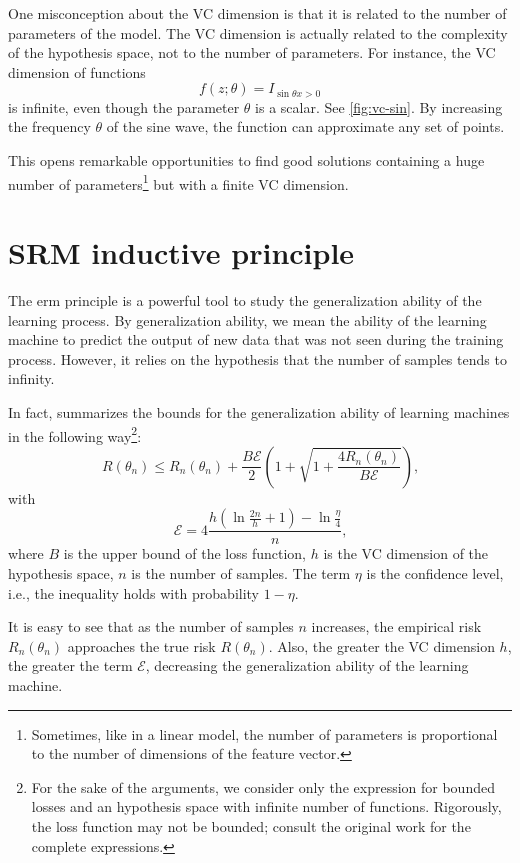 One misconception about the VC dimension is that it is related to the number of parameters
of the model.  The VC dimension is actually related to the complexity of the hypothesis space, not
to the number of parameters.  For instance, the VC dimension of functions
\[
  f(z; \theta) = I_{\sin \theta x > 0}
\]
is infinite, even though the parameter $\theta$ is a scalar.  See \cref{fig:vc-sin}.
By increasing the frequency $\theta$ of the sine wave, the function can approximate any set
of points.

This opens remarkable opportunities to find good solutions containing a huge number of
parameters\footnote{Sometimes, like in a linear model, the number of parameters is
proportional to the number of dimensions of the feature vector.} but with a finite VC
dimension.  %

\section{SRM inductive principle}

The \gls{erm} principle is a powerful tool to study the generalization ability of the
learning process.  By generalization ability, we mean the ability of the learning machine
to predict the output of new data that was not seen during the training process.  However,
it relies on the hypothesis that the number of samples tends to infinity.

In fact, \textcite{Vapnik1999b} summarizes the bounds for the
generalization ability of learning machines in the following way\footnote{ For the sake of
the arguments, we consider only the expression for bounded losses and an hypothesis space
with infinite number of functions.  Rigorously, the loss function may not be bounded;
consult the original work for the complete expressions.}:
\begin{equation}
  \label{eq:generalization-bound}
  R(\theta_n) \leq R_n(\theta_n) + \frac{B \mathcal{E}}{2} \left(
    1 + \sqrt{1 + \frac{4 R_n(\theta_n)}{B \mathcal{E}}}
  \right)\text{,}
\end{equation}
with
\[
  \mathcal{E} = 4 \frac{
    h \left( \ln \frac{2 n}{h} + 1 \right) - \ln \frac{\eta}{4}
  }{n}\text{,}
\]
where $B$ is the upper bound of the loss function, $h$ is the VC dimension of the
hypothesis space, $n$ is the number of samples.  The term $\eta$ is the confidence level,
i.e., the inequality holds with probability $1 - \eta$.

It is easy to see that as the number of samples $n$ increases, the empirical risk
$R_n(\theta_n)$ approaches the true risk $R(\theta_n)$.  Also, the greater the VC
dimension $h$, the greater the term $\mathcal{E}$, decreasing the generalization ability
of the learning machine.

